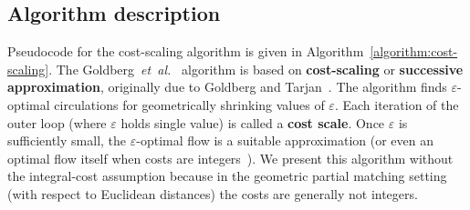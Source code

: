 \documentclass[11pt]{article}
\makeatletter
\def\etal{\textit{et~al.}}
\def\polylog{\mathop{\mathrm{polylog}}}
\def\eps{\varepsilon}
\def\cost{\operatorname{cost}}
\theoremstyle{plain}
\newtheorem{corollary}[lemma]{Corollary}
\numberwithin{figure}{section}
\def\EMPH#1{\textbf{\boldmath #1}}
\def\n@te#1{\textsf{\boldmath \textbf{$\langle\!\langle$#1$\rangle\!\rangle$}}\leavevmode}
\def\note#1{\textcolor{red}{\n@te{#1}}}
\makeatother
\begin{document}
%

\subsection{Algorithm description}

Pseudocode for the cost-scaling algorithm is given in
Algorithm~\ref{algorithm:cost-scaling}.
The Goldberg~{\etal}~\cite{GHKT17} algorithm is based on \EMPH{cost-scaling} or
\EMPH{successive approximation}, originally due to Goldberg and
Tarjan~\cite{GT90}.
The algorithm finds $\eps$-optimal circulations for geometrically shrinking
values of $\eps$.
Each iteration of the outer loop (where $\eps$ holds single value) is called a
\EMPH{cost scale}.
Once $\eps$ is sufficiently small, the $\eps$-optimal flow is a suitable
approximation (or even an optimal flow itself when costs are integers~\cite{GT90,GHKT17}).
We present this algorithm without the integral-cost assumption because in the geometric
partial matching setting (with respect to Euclidean distances) the costs are generally not integers.
\end{document}
